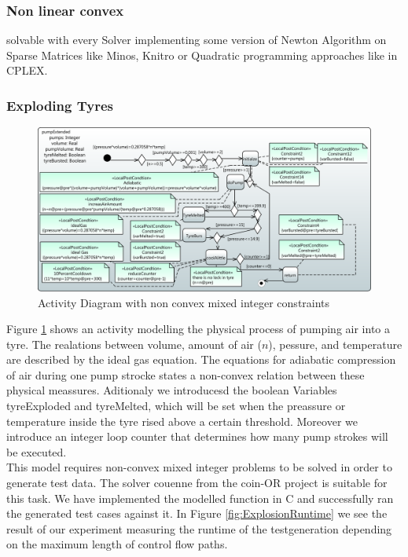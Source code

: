 \subsubsection{Non linear convex}
solvable with every Solver implementing some version of Newton Algorithm on Sparse Matrices like Minos, Knitro or Quadratic programming approaches like in CPLEX.
\subsubsection{Exploding Tyres}
\label{sec:exampleModelNonConvex}
\begin{figure}
\label{fig:pumpTyre}
\includegraphics[width=\textwidth]{./pics/pumpTyre.pdf}
\caption{Activity Diagram with non convex mixed integer constraints}
\end{figure}
Figure \ref{fig:pumpTyre} shows an activity modelling the physical process of pumping air into a tyre. The realations between volume, amount of air ($n$), pessure, and temperature are described by the ideal gas equation. The equations for adiabatic compression of air during one pump strocke states a non-convex relation between these physical meassures. Aditionaly we introducesd the boolean Variables tyreExploded and tyreMelted, which will be set when the preassure or temperature inside the tyre rised above a certain threshold. Moreover we introduce an integer loop counter that determines how many pump strokes will be executed.\\
This model requires non-convex mixed integer problems to be solved in order to generate test data. The solver couenne from the coin-OR project is suitable for this task. We have implemented the modelled function in C and successfully ran the generated test cases against it. In Figure \ref{fig:ExplosionRuntime} we see the result of our experiment measuring the runtime of the testgeneration depending on the maximum length of control flow paths.\\
